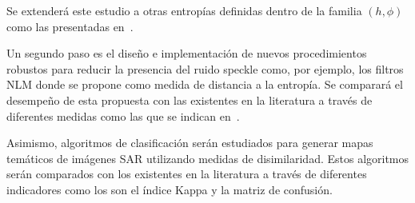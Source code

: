 \documentclass[12pt]{article}
\begin{document}
Se extenderá este estudio a otras entropías definidas dentro de la familia $(h,\phi)$ como las presentadas en~\cite{Frery2019}.

Un segundo paso es el diseño e implementación de nuevos procedimientos robustos para reducir la presencia del ruido speckle como, por ejemplo, los filtros NLM donde se propone como medida de distancia a la entropía. Se comparará el desempeño de esta propuesta con las existentes en la literatura a través de diferentes medidas como las que se indican en~\cite{Frery2019}.

Asimismo, algoritmos de clasificación serán estudiados para generar mapas temáticos de imágenes SAR utilizando medidas de disimilaridad. Estos algoritmos serán comparados con los existentes en la literatura a través de diferentes indicadores como los son el índice Kappa y la matriz de confusión.

%


\end{document}
